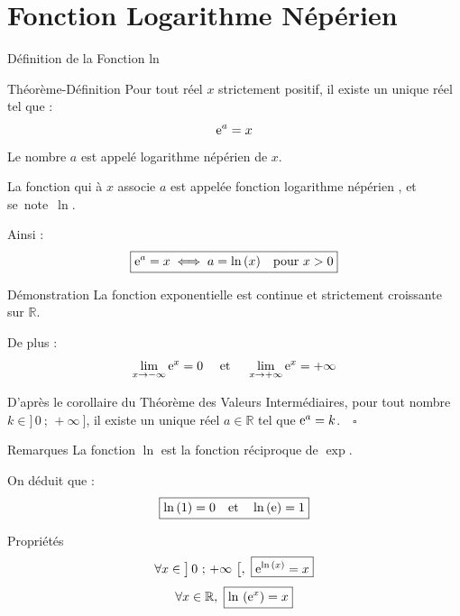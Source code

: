\documentclass{coursbook}
\begin{document}
    \chapter{Fonction Logarithme Népérien}

    \begin{Gpartie}{Définition de la Fonction ln}
        \begin{Spartie}{Théorème-Définition}
            Pour tout réel $x$ strictement positif, il existe un unique réel tel que :
            \[\mathrm{e}^a=x\]
            Le nombre $a$ est appelé logarithme népérien de $x$.
            
            La fonction qui à $x$ associe $a$ est appelée \og fonction logarithme népérien \fg{}, et se~note~$\ln$.

            Ainsi :
            \[\boxed{\mathrm{e}^a=x\iff a=\ln\,(x)\quad\text{pour $x>0$}}\]
        \end{Spartie}
        \begin{Spartie}{Démonstration}
            La fonction exponentielle est continue et strictement croissante sur $\mathbb{R}$.

            De plus :
            \[\lim_{x\to -\infty} \mathrm{e}^x=0\quad\text{ et }\quad\lim_{x\to +\infty} \mathrm{e}^x=+\infty\]

            D'après le corollaire du Théorème des Valeurs Intermédiaires, pour tout nombre $k\in\big]\,0~;\,+\infty~\big]$, il existe un unique réel $a\in\mathbb{R}$ tel que $\mathrm{e}^a=k$.$\quad\square$
        \end{Spartie}
        \begin{Spartie}{Remarques}
            La fonction $\ln$ est la fonction réciproque de $\exp$.

            On déduit que : \[\boxed{\ln\,(1)=0\quad\text{et}\quad\ln\,(\mathrm{e})=1}\]
        \end{Spartie}
        \begin{Spartie}{Propriétés}
            \[\forall x\in\big]\,0~;\,+\infty~\big[,~\boxed{\mathrm{e}^{\ln\,(x)}=x}\]
            \[\forall x\in\mathbb{R},~\boxed{\ln\,\left(\mathrm{e}^x\right)=x}\]
        \end{Spartie}
    \end{Gpartie}
    \pagebreak
\end{document}
